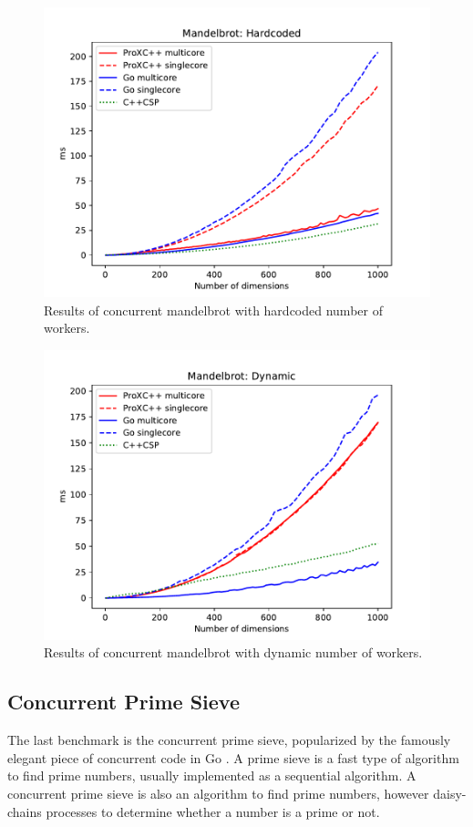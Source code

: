 \begin{figure}[h!]
    \centering
    \includegraphics[width=0.8\linewidth]{fig/mandelbrot_hardcoded}
    \caption{Results of concurrent mandelbrot with hardcoded number of workers.}
    \label{fig:mandelbrot_hardcoded}
\end{figure}

\begin{figure}[h!]
    \centering
    \includegraphics[width=0.8\linewidth]{fig/mandelbrot_dynamic}
    \caption{Results of concurrent mandelbrot with dynamic number of workers.}
    \label{fig:mandelbrot_dynamic}
\end{figure}


\subsection{Concurrent Prime Sieve}


The last benchmark is the concurrent prime sieve, popularized by the famously elegant piece of concurrent code in Go \citep{go2017primesieve}. A prime sieve is a fast type of algorithm to find prime numbers, usually implemented as a sequential algorithm. A concurrent prime sieve is also an algorithm to find prime numbers, however daisy\hyp{}chains processes to determine whether a number is a prime or not.

